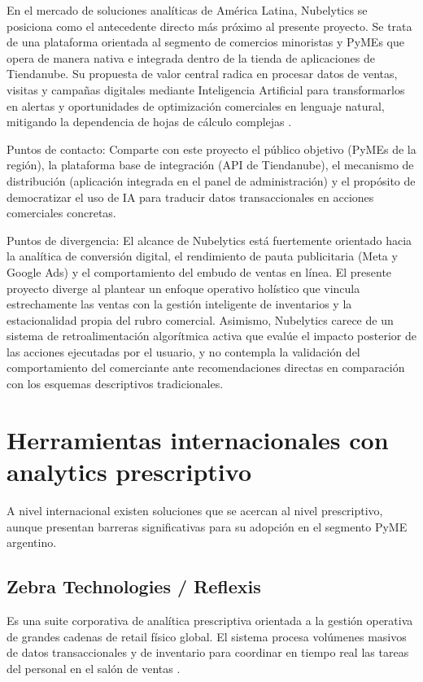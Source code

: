 En el mercado de soluciones analíticas de América Latina, Nubelytics se posiciona como el antecedente directo más próximo al presente proyecto. Se trata de una plataforma orientada al segmento de comercios minoristas y PyMEs que opera de manera nativa e integrada dentro de la tienda de aplicaciones de Tiendanube. Su propuesta de valor central radica en procesar datos de ventas, visitas y campañas digitales mediante Inteligencia Artificial para transformarlos en alertas y oportunidades de optimización comerciales en lenguaje natural, mitigando la dependencia de hojas de cálculo complejas \parencite{Nubelytics2025}.

Puntos de contacto: Comparte con este proyecto el público objetivo (PyMEs de la región), la plataforma base de integración (API de Tiendanube), el mecanismo de distribución (aplicación integrada en el panel de administración) y el propósito de democratizar el uso de IA para traducir datos transaccionales en acciones comerciales concretas.

Puntos de divergencia: El alcance de Nubelytics está fuertemente orientado hacia la analítica de conversión digital, el rendimiento de pauta publicitaria (Meta y Google Ads) y el comportamiento del embudo de ventas en línea. El presente proyecto diverge al plantear un enfoque operativo holístico que vincula estrechamente las ventas con la gestión inteligente de inventarios y la estacionalidad propia del rubro comercial. Asimismo, Nubelytics carece de un sistema de retroalimentación algorítmica activa que evalúe el impacto posterior de las acciones ejecutadas por el usuario, y no contempla la validación del comportamiento del comerciante ante recomendaciones directas en comparación con los esquemas descriptivos tradicionales.

\section{Herramientas internacionales con analytics prescriptivo}

A nivel internacional existen soluciones que se acercan al nivel prescriptivo, aunque presentan barreras significativas para su adopción en el segmento PyME argentino.

\subsection{Zebra Technologies / Reflexis}

Es una suite corporativa de analítica prescriptiva orientada a la gestión operativa de grandes cadenas de retail físico global. El sistema procesa volúmenes masivos de datos transaccionales y de inventario para coordinar en tiempo real las tareas del personal en el salón de ventas \parencite{ZebraReflexis2024}.

